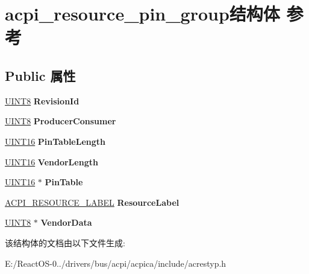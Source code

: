 \hypertarget{structacpi__resource__pin__group}{}\section{acpi\+\_\+resource\+\_\+pin\+\_\+group结构体 参考}
\label{structacpi__resource__pin__group}
\subsection*{Public 属性}
\begin{DoxyCompactItemize}
\item 
\mbox{\label{structacpi__resource__pin__group_a82cc0293f52add7b7d0f21defccb5c68}} 
\hyperlink{_processor_bind_8h_ab27e9918b538ce9d8ca692479b375b6a}{U\+I\+N\+T8} {\bfseries Revision\+Id}
\item 
\mbox{\label{structacpi__resource__pin__group_a56d74d8ff92ca3f0ea9d8cf3dcdc0a36}} 
\hyperlink{_processor_bind_8h_ab27e9918b538ce9d8ca692479b375b6a}{U\+I\+N\+T8} {\bfseries Producer\+Consumer}
\item 
\mbox{\label{structacpi__resource__pin__group_a8596ccce6c5843dca4662a30ff7ca476}} 
\hyperlink{_processor_bind_8h_a09f1a1fb2293e33483cc8d44aefb1eb1}{U\+I\+N\+T16} {\bfseries Pin\+Table\+Length}
\item 
\mbox{\label{structacpi__resource__pin__group_a3a8197f19690981973f17fad49fd9a47}} 
\hyperlink{_processor_bind_8h_a09f1a1fb2293e33483cc8d44aefb1eb1}{U\+I\+N\+T16} {\bfseries Vendor\+Length}
\item 
\mbox{\label{structacpi__resource__pin__group_a147bc9609a0161bcd036bb09cdcaac8e}} 
\hyperlink{_processor_bind_8h_a09f1a1fb2293e33483cc8d44aefb1eb1}{U\+I\+N\+T16} $\ast$ {\bfseries Pin\+Table}
\item 
\mbox{\label{structacpi__resource__pin__group_a12bd8968cb60a3a83eec90b8bb5f033d}} 
\hyperlink{structacpi__resource__label}{A\+C\+P\+I\+\_\+\+R\+E\+S\+O\+U\+R\+C\+E\+\_\+\+L\+A\+B\+EL} {\bfseries Resource\+Label}
\item 
\mbox{\label{structacpi__resource__pin__group_a38e1fa2bb69040879f44853dbec77960}} 
\hyperlink{_processor_bind_8h_ab27e9918b538ce9d8ca692479b375b6a}{U\+I\+N\+T8} $\ast$ {\bfseries Vendor\+Data}
\end{DoxyCompactItemize}


该结构体的文档由以下文件生成\+:\begin{DoxyCompactItemize}
\item 
E\+:/\+React\+O\+S-\/0../drivers/bus/acpi/acpica/include/acrestyp.\+h\end{DoxyCompactItemize}
